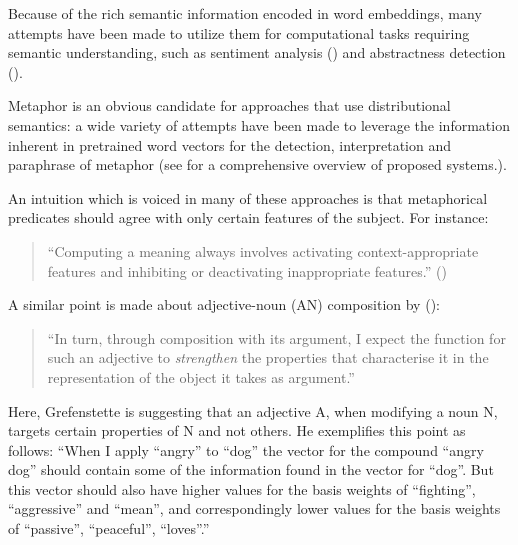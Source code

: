 \documentclass[10pt,letterpaper,twocolumn]{article}
\begin{document}




	Because of the rich semantic information encoded in word embeddings, many attempts have been made to utilize them for computational tasks requiring semantic understanding, such as sentiment analysis (\cite{socher2013recursive}) and abstractness detection (\cite{turney}).


Metaphor is an obvious candidate for approaches that use distributional semantics: a wide variety of attempts have been made to leverage the information inherent in pretrained word vectors for the detection, interpretation and paraphrase of metaphor (see \cite{shutova2016design} for a comprehensive overview of proposed systems.).

An intuition which is voiced in many of these approaches is that metaphorical predicates should agree with only certain features of the subject. For instance:
\begin{quote}	``Computing a meaning always involves activating context-appropriate features and inhibiting or deactivating inappropriate features.'' (\cite{kintsch})
\end{quote}

A similar point is made about adjective-noun (AN) composition by (\cite{grefenstette2013category}): \begin{quote} ``In turn, through composition with its argument, I expect the function for such an adjective to \emph{strengthen} the properties that characterise it in the representation of the object it takes as argument.''
\end{quote}

Here, Grefenstette is suggesting that an adjective A, when modifying a noun N, targets certain properties of N and not others. He exemplifies this point as follows: ``When I apply ``angry'' to ``dog'' the vector for the compound ``angry dog'' should contain some of the information found in the vector for ``dog''. But this vector should also have higher values for the basis weights of ``fighting'', ``aggressive'' and ``mean'', and correspondingly lower values for the basis weights of ``passive'', ``peaceful'', ``loves''.''
\end{document}
